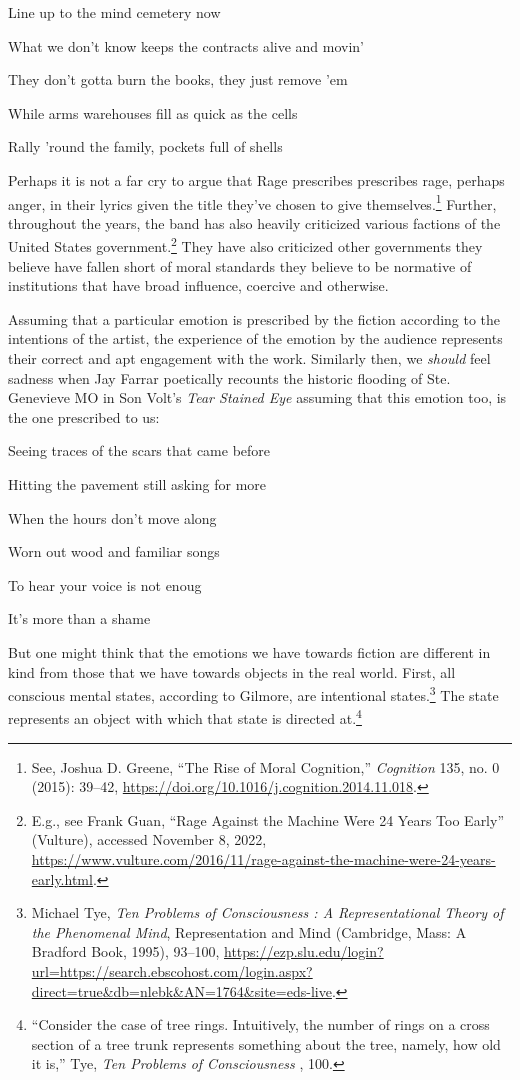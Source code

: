 \documentclass[phdthesis,12pt,final,a4paper]{wuthesis}
\theoremstyle{definition}
\theoremstyle{definition}
\theoremstyle{definition}
\theoremstyle{definition}
\theoremstyle{remark}
\begin{document}
Line up to the mind cemetery now

What we don't know keeps the contracts alive and movin'

They don't gotta burn the books, they just remove 'em

While arms warehouses fill as quick as the cells

Rally 'round the family, pockets full of shells

\noindent Perhaps it is not a far cry to argue that Rage prescribes prescribes rage, perhaps anger, in their lyrics given the title they've chosen to give themselves.\footnote{See, Joshua D. Greene, {``The Rise of Moral Cognition,''} \emph{Cognition} 135, no. 0 (2015): 39--42, \url{https://doi.org/10.1016/j.cognition.2014.11.018}.} Further, throughout the years, the band has also heavily criticized various factions of the United States government.\footnote{E.g., see Frank Guan, {``Rage Against the Machine Were 24 Years Too Early''} (Vulture), accessed November 8, 2022, \url{https://www.vulture.com/2016/11/rage-against-the-machine-were-24-years-early.html}.} They have also criticized other governments they believe have fallen short of moral standards they believe to be normative of institutions that have broad influence, coercive and otherwise.

Assuming that a particular emotion is prescribed by the fiction according to the intentions of the artist, the experience of the emotion by the audience represents their correct and apt engagement with the work. Similarly then, we \emph{should} feel sadness when Jay Farrar poetically recounts the historic flooding of Ste. Genevieve MO in Son Volt's \emph{Tear Stained Eye} assuming that this emotion too, is the one prescribed to us:

Seeing traces of the scars that came before

Hitting the pavement still asking for more

When the hours don't move along

Worn out wood and familiar songs

To hear your voice is not enoug

It's more than a shame

But one might think that the emotions we have towards fiction are different in kind from those that we have towards objects in the real world. First, all conscious mental states, according to Gilmore, are intentional states.\footnote{Michael Tye, \emph{Ten {Problems} of {Consciousness} : {A Representational Theory} of the {Phenomenal Mind}}, Representation and {Mind} (Cambridge, Mass: A Bradford Book, 1995), 93--100, \url{https://ezp.slu.edu/login?url=https://search.ebscohost.com/login.aspx?direct=true&db=nlebk&AN=1764&site=eds-live}.} The state represents an object with which that state is directed at.\footnote{``Consider the case of tree rings. Intuitively, the number of rings on a cross section of a tree trunk represents something about the tree, namely, how old it is,'' Tye, \emph{Ten {Problems} of {Consciousness} }, 100.}
\end{document}
